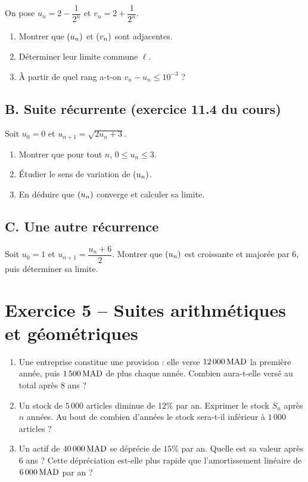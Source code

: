 \documentclass[11pt,a4paper]{article}
\begin{document}
On pose $u_n = 2 - \dfrac{1}{2^n}$ et $v_n = 2 + \dfrac{1}{2^n}$.
\begin{enumerate}
  \item Montrer que $(u_n)$ et $(v_n)$ sont adjacentes.
  \item Déterminer leur limite commune $\ell$.
  \item À partir de quel rang a-t-on $v_n - u_n \leq 10^{-3}$ ?
\end{enumerate}

\subsection*{B. Suite récurrente (exercice 11.4 du cours)}

Soit $u_0 = 0$ et $u_{n+1} = \sqrt{2u_n + 3}$.
\begin{enumerate}
  \item Montrer que pour tout $n$, $0 \leq u_n \leq 3$.
  \item Étudier le sens de variation de $(u_n)$.
  \item En déduire que $(u_n)$ converge et calculer sa limite.
\end{enumerate}

\subsection*{C. Une autre récurrence}

Soit $u_0 = 1$ et $u_{n+1} = \dfrac{u_n + 6}{2}$. Montrer que $(u_n)$ est croissante et majorée par $6$, puis déterminer sa limite.

\section*{Exercice 5 -- Suites arithmétiques et géométriques}

\begin{enumerate}
  \item Une entreprise constitue une provision : elle verse $12\,000\,\mathrm{MAD}$ la première année, puis $1\,500\,\mathrm{MAD}$ de plus chaque année. Combien aura-t-elle versé au total après $8$ ans ?
  \item Un stock de $5\,000$ articles diminue de $12\%$ par an. Exprimer le stock $S_n$ après $n$ années. Au bout de combien d'années le stock sera-t-il inférieur à $1\,000$ articles ?
  \item Un actif de $40\,000\,\mathrm{MAD}$ se déprécie de $15\%$ par an. Quelle est sa valeur après $6$ ans ? Cette dépréciation est-elle plus rapide que l'amortissement linéaire de $6\,000\,\mathrm{MAD}$ par an ?
\end{enumerate}
\end{document}
